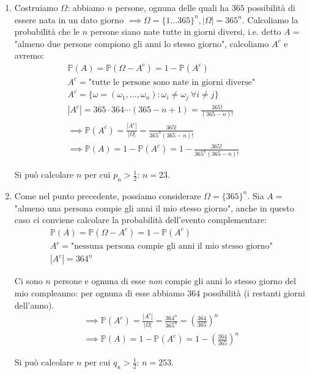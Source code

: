 \begin{enumerate}
\item Costruiamo $\Omega $: abbiamo $n$ persone, ognuna delle quali ha $365$ possibilità di essere nata in un dato giorno $\implies \Omega =\{1\dotsc 365\}^{n} ,| \Omega | =365^{n}$. Calcoliamo la probabilità che le $n$ persone siano nate tutte in giorni diversi, i.e. detto $A=$ "almeno due persone compiono gli anni lo stesso giorno", calcoliamo $A^{c}$ e avremo:\begin{equation*}
\begin{array}{ l }
\mathbb{P}( A) =\mathbb{P}\left( \Omega -A^{c}\right) =1-\mathbb{P}\left( A^{c}\right)\\
A^{c} =\text{"tutte le persone sono nate in giorni diverse"}\\
A^{c} =\{\omega =( \omega _{1} ,\dotsc ,\omega _{n}) :\omega _{i} \neq \omega _{j} \ \forall i\neq j\}\\
\left| A^{c}\right| =365\cdot 364\cdots ( 365-n+1) =\frac{365!}{( 365-n) !}\\
\mathbb{\implies P}\left( A^{c}\right) =\frac{\left| A^{c}\right| }{| \Omega | } =\frac{365!}{365^{n}( 365-n) !}\\
\mathbb{\implies P}( A) =1-\mathbb{P}\left( A^{c}\right) =1-\frac{365!}{365^{n}( 365-n) !}
\end{array}
\end{equation*}

Si può calcolare $n$ per cui $p_{n}  >\frac{1}{2}$: $n=23$.
\item Come nel punto precedente, possiamo considerare $\Omega =\{365\}^{n}$. Sia $A=$ "almeno una persona compie gli anni il mio stesso giorno", anche in questo caso ci conviene calcolare la probabilità dell'evento complementare:\begin{equation*}
\begin{array}{ l }
\mathbb{P}( A) =\mathbb{P}\left( \Omega -A^{c}\right) =1-\mathbb{P}\left( A^{c}\right)\\
A^{c} =\text{"nessuna persona compie gli anni il mio stesso giorno"}\\
\left| A^{c}\right| =364^{n}
\end{array}
\end{equation*}

Ci sono $n$ persone e ognuna di esse \textit{non} compie gli anni lo stesso giorno del mio compleanno: per ognuna di esse abbiamo $364$ possibilità (i restanti giorni dell'anno).\begin{equation*}
\begin{array}{ l }
\mathbb{\implies P}\left( A^{c}\right) =\frac{\left| A^{c}\right| }{| \Omega | } =\frac{364^{n}}{365^{n}} =\left(\frac{364}{365}\right)^{n}\\
\mathbb{\implies P}( A) =1-\mathbb{P}\left( A^{c}\right) =1-\left(\frac{364}{365}\right)^{n}
\end{array}
\end{equation*}

Si può calcolare $n$ per cui $q_{n}  >\frac{1}{2}$: $n=253$.
\end{enumerate}
\Soluzione

